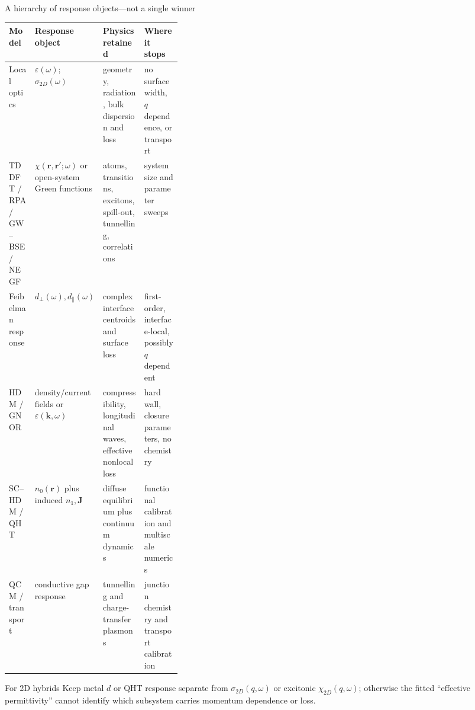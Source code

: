 \documentclass[aspectratio=169,10pt]{beamer}
\begin{document}
\begin{frame}{A hierarchy of response objects—not a single winner}
\scriptsize
\begin{tabularx}{\linewidth}{@{}p{0.15\linewidth}p{0.19\linewidth}Y Y@{}}
\toprule
\textbf{Model} & \textbf{Response object} & \textbf{Physics retained} & \textbf{Where it stops}\\
\midrule
Local optics & $\varepsilon(\omega)$; $\sigma_{2D}(\omega)$ & geometry, radiation, bulk dispersion and loss & no surface width, $q$ dependence, or transport\\
TDDFT / RPA / GW--BSE / NEGF & $\chi(\mathbf r,\mathbf r';\omega)$ or open-system Green functions & atoms, transitions, excitons, spill-out, tunnelling, correlations & system size and parameter sweeps\\
Feibelman response & $d_\perp(\omega),d_\parallel(\omega)$ & complex interface centroids and surface loss & first-order, interface-local, possibly $q$ dependent\\
HDM / GNOR & density/current fields or $\varepsilon(\mathbf k,\omega)$ & compressibility, longitudinal waves, effective nonlocal loss & hard wall, closure parameters, no chemistry\\
SC--HDM / QHT & $n_0(\mathbf r)$ plus induced $n_1,\mathbf J$ & diffuse equilibrium plus continuum dynamics & functional calibration and multiscale numerics\\
QCM / transport & conductive gap response & tunnelling and charge-transfer plasmons & junction chemistry and transport calibration\\
\bottomrule
\end{tabularx}
\vspace{0.45em}
\begin{alertblock}{For 2D hybrids}
  Keep metal $d$ or QHT response separate from $\sigma_{2D}(q,\omega)$ or excitonic $\chi_{2D}(q,\omega)$; otherwise the fitted ``effective permittivity'' cannot identify which subsystem carries momentum dependence or loss.
\end{alertblock}
\end{frame}
\end{document}
